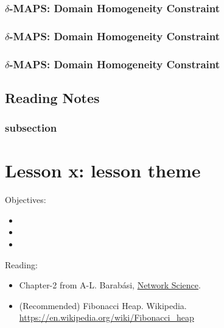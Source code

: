 \documentclass[11pt]{scrartcl} %
\begin{document}
\subsubsection{$\delta$-MAPS: Domain Homogeneity Constraint}
\subsubsection{$\delta$-MAPS: Domain Homogeneity Constraint}
\subsubsection{$\delta$-MAPS: Domain Homogeneity Constraint}
\subsubsection{}

\subsection{Reading Notes}

\subsubsection{subsection}
\textbf{}


\section{Lesson x: lesson theme}

Objectives:
\begin{itemize}
	\item 
	\item 
	\item 
\end{itemize}

Reading:
\begin{itemize}
	\item Chapter-2 from A-L. Barabási, \href{http://networksciencebook.com/}{Network Science}.
	\item (Recommended) Fibonacci Heap. Wikipedia. \url{https://en.wikipedia.org/wiki/Fibonacci\_heap}
\end{itemize}
\end{document}
